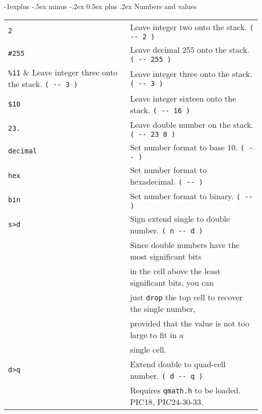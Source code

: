 \documentclass[10pt,landscape,a4paper]{article}
\makeatletter
\renewcommand{\subsection}{\@startsection{subsection}{2}{0mm}%
                                {-1explus -.5ex minus -.2ex}%
                                {0.5ex plus .2ex}%
                                {\normalfont\normalsize\bfseries}}
\makeatother
\begin{document}
\begin{multicols}{3}
\subsection{Numbers and values}
\begin{tabular}{@{}ll@{}}
\verb!2!  & Leave integer two onto the stack. \verb!( -- 2 )! \\
\verb!#255!  & Leave decimal 255 onto the stack. \verb!( -- 255 )! \\
\verb!%11!  & Leave integer three onto the stack. \verb!( -- 3 )! \\
\verb!$10!  & Leave integer sixteen onto the stack. \verb!( -- 16 )! \\
\verb!23.!  & Leave double number on the stack. \verb!( -- 23 0 )! \\
\verb!decimal!  & Set number format to base 10. \verb!( -- )! \\
\verb!hex!  & Set number format to hexadecimal. \verb!( -- )! \\
\verb!bin!  & Set number format to binary. \verb!( -- )! \\
\verb!s>d!  & Sign extend single to double number. \verb!( n -- d )! \\
            & Since double numbers have the most significant bits \\
            & in the cell above the least significant bits, you can \\
            & just \verb!drop! the top cell to recover the single number, \\
            & provided that the value is not too large to fit in a \\
            & single cell.\\
\verb!d>q!  & Extend double to quad-cell number. \verb!( d -- q )!\\
            & Requires \verb!qmath.h! to be loaded.  PIC18, PIC24-30-33.\\
\end{tabular}


\end{multicols}
\end{document}
